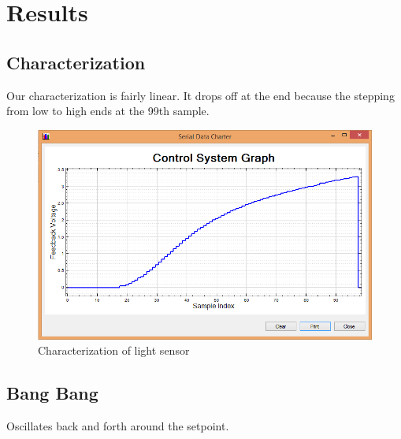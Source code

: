 \documentclass[11pt]{article}
\begin{document}
\section{Results}


\subsection{Characterization}
Our characterization is fairly linear. It drops off at the end because the stepping from low to high ends at the 99th sample.

	\begin{figure}[H]\centering
	\includegraphics[height=0.7\textwidth]{images/characterize.png}
	\caption{Characterization of light sensor}
		\label{characterization}
	\end{figure}

\subsection{Bang Bang}
Oscillates back and forth around the setpoint. 
\end{document}
